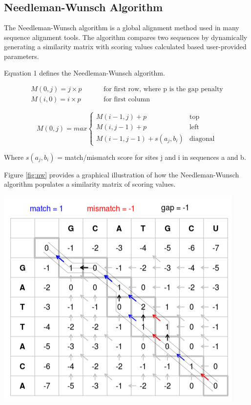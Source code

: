 \documentclass{article}
\begin{document}
\subsection*{Needleman-Wunsch Algorithm}
The Needleman-Wunsch algorithm is a global alignment method used in many
sequence alignment tools. The algorithm compares two sequences by dynamically
generating a similarity matrix with scoring values calculated based
user-provided parameters.

Equation 1 defines the Needleman-Wunsch algorithm.

\begin{align*}
    M(0, j) = j \times p  \hspace{1cm}&\text{for first row, where p is the gap
    penalty} \\
    M(i, 0) = i \times p  \hspace{1cm}&\text{for first column}
\end{align*}

\begin{equation}
    M(0, j) = max \begin{cases}
        M(i-1, j) + p & \text{top} \\
        M(i, j-1) + p & \text{left} \\
        M(i-1, j-1) + s(a_j , b_i) & \text{diagonal}
  \end{cases}
\end{equation}

Where $s(a_j , b_i)$ = match/mismatch score for sites j and i in sequences a and
b. \cite{columbia}

Figure \ref{fig:nw} provides a graphical illustration of how the Needleman-Wunsch
algorithm populates a similarity matrix of scoring values.

\begin{center}
    \includegraphics[scale=0.7]{nw.png}
    \label{fig:nw}
\end{center}
\end{document}
